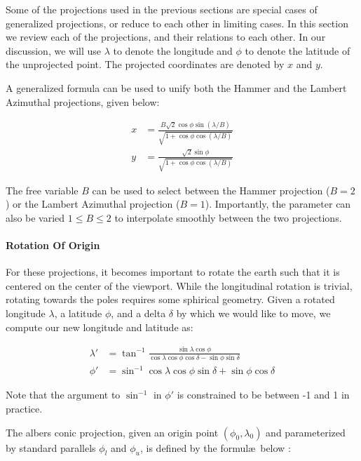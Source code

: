 Some of the projections used in the previous sections are special cases of
  generalized projections, or reduce to each other in limiting cases.
In this section we review each of the projections, and their relations to
  each other.
In our discussion, we will use $\lambda$ to denote the longitude and $\phi$
  to denote the latitude of the unprojected point.
The projected coordinates are denoted by $x$ and $y$.

A generalized formula can be used to unify both the Hammer and the Lambert
  Azimuthal projections, given below:

\def\nu{ \sqrt{1 + \cos \phi \cos (\lambda / B)} }
\begin{align}
x &= \frac{ B \sqrt{2} \cos \phi \sin (\lambda / B) } { \nu } \\
y &= \frac{ \sqrt{2} \sin \phi }{ \nu }
\end{align}

The free variable $B$ can be used to select between the Hammer projection
  ($B = 2$) or the Lambert Azimuthal projection ($B = 1$).
Importantly, the parameter can also be varied $1 \leq B \leq 2$ to interpolate
  smoothly between the two projections.

\paragraph{Rotation Of Origin}
For these projections, it becomes important to rotate the earth such that it is
  centered on the center of the viewport.
While the longitudinal rotation is trivial, rotating towards the poles requires
  some sphirical geometry.
Given a rotated longitude $\lambda$, a latitude $\phi$, and a delta $\delta$ by
  which we would like to move, we compute our new longitude and latitude as:

\def\cosdelta{ \cos \delta }
\def\sindelta{ \sin \delta }
\def\clat{ \cos \phi }
\def\x{ \cos \lambda \clat }
\def\y{ \sin \lambda \clat }
\def\z{ \sin \phi }
\def\k{ \x \sindelta + \z \cosdelta }
\begin{align}
\lambda' &= \tan^{-1} \frac{\y}{ \x \cosdelta - \z \sindelta } \\
\phi' &= \sin^{-1} \k
\end{align}

Note that the argument to $\sin^{-1}$ in $\phi'$ is constrained to be between
  -1 and 1 in practice.

The albers conic projection, given an origin point $(\phi_0, \lambda_0)$
  and parameterized by standard parallels $\phi_l$ and $\phi_u$,
  is defined by the formul\ae\ below \cite{key:weisstein-albers}:

